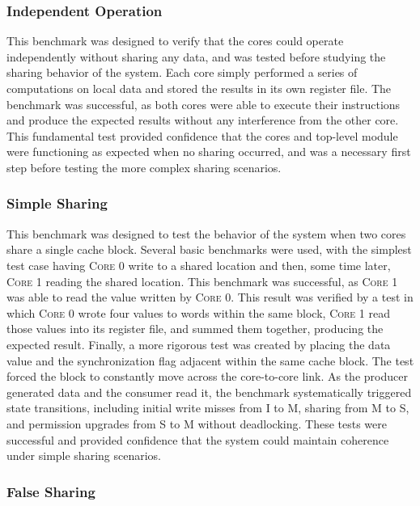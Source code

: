 \documentclass[10pt, compsoc]{IEEEtran}
\begin{document}
\subsubsection*{Independent Operation}

This benchmark was designed to verify that the cores could operate independently without sharing any data, and was tested before studying the sharing behavior of the system. Each core simply performed a series of computations on local data and stored the results in its own register file. The benchmark was successful, as both cores were able to execute their instructions and produce the expected results without any interference from the other core. This fundamental test provided confidence that the cores and top-level module were functioning as expected when no sharing occurred, and was a necessary first step before testing the more complex sharing scenarios.



\subsubsection*{Simple Sharing}

This benchmark was designed to test the behavior of the system when two cores share a single cache block. Several basic benchmarks were used, with the simplest test case having \textsc{Core 0} write to a shared location and then, some time later, \textsc{Core 1} reading the shared location. This benchmark was successful, as \textsc{Core 1} was able to read the value written by \textsc{Core 0}. This result was verified by a test in which \textsc{Core 0} wrote four values to words within the same block, \textsc{Core 1} read those values into its register file, and summed them together, producing the expected result. Finally, a more rigorous test was created by placing the data value and the synchronization flag adjacent within the same cache block. The test forced the block to constantly move across the core-to-core link. As the producer generated data and the consumer read it, the benchmark systematically triggered state transitions, including initial write misses from I to M, sharing from M to S, and permission upgrades from S to M without deadlocking. These tests were successful and provided confidence that the system could maintain coherence under simple sharing scenarios.



\subsubsection*{False Sharing}
\end{document}
